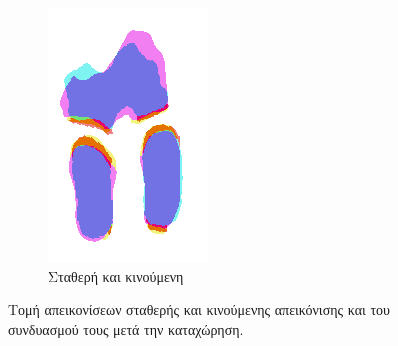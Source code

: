 \documentclass[a4paper,12pt]{article}
\begin{document}
\begin{figure}[H]
    \begin{subfigure}[t]{0.4\linewidth}
    \includegraphics[width=\linewidth]{combination_label_after_registration_2.png}
    \caption{Σταθερή και κινούμενη}
    \end{subfigure}

    \caption{Τομή απεικονίσεων σταθερής και κινούμενης απεικόνισης και του
             συνδυασμού τους μετά την καταχώρηση.}
    \label{fig:registration_after:2}
\end{figure}
\end{document}
